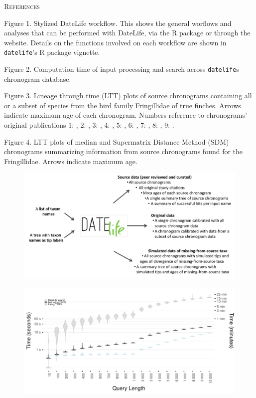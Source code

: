 \documentclass[11pt,]{article}
\begin{document}
\newpage

\begin{center}
\textsc{References}
\end{center}

Figure 1. Stylized DateLife workflow. This shows the general worflows
and analyses that can be performed with DateLife, via the R package or
through the website. Details on the functions involved on each workflow
are shown in \texttt{datelife}'s R package vignette.

Figure 2. Computation time of input processing and search across
\texttt{datelife}s chronogram database.

Figure 3. Lineage through time (LTT) plots of source chronograms
containing all or a subset of species from the bird family Fringillidae
of true finches. Arrows indicate maximum age of each chronogram. Numbers
reference to chronograms' original publications 1:
\citet{barker2012going}, 2: \citet{barker2015new}, 3:
\citet{burns2014phylogenetics}, 4: \citet{claramunt2015new}, 5:
\citet{gibb2015new}, 6: \citet{Hedges2015}, 7:
\citet{hooper2017chromosomal}, 8: \citet{Jetz2012}, 9:
\citet{price2014niche}.

Figure 4. LTT plots of median and Supermatrix Distance Method (SDM)
chronograms summarizing information from source chronograms found for
the Fringillidae. Arrows indicate maximum age.

\newpage

\begin{figure}[!h]
\includegraphics{Fig1.pdf}
\caption{}
\label{fig:workflow}
\end{figure}

\newpage

\begin{figure}[!h]
\includegraphics{fig_runtime1.pdf}
\caption{}
\label{fig:runtime1}
\end{figure}
\end{document}
